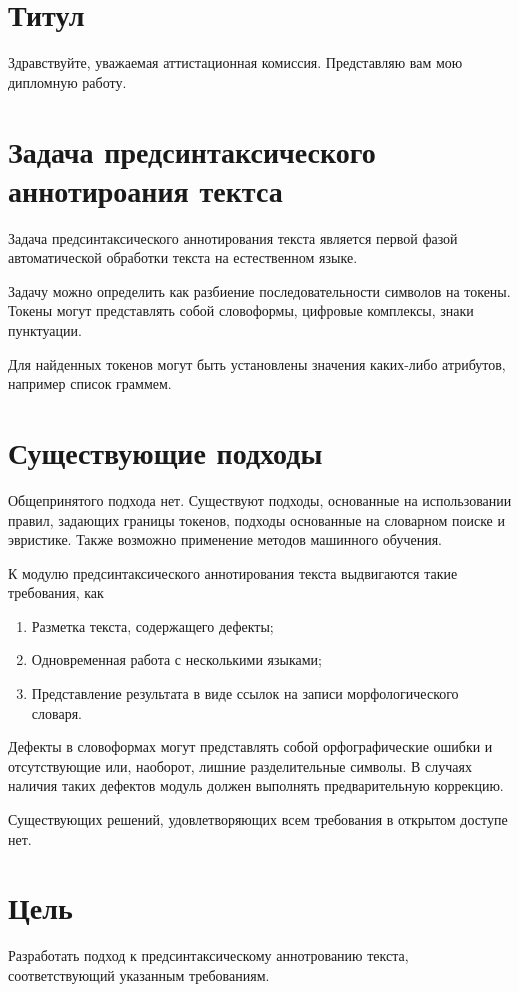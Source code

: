 \documentclass[14pt]{extarticle}
\begin{document}
\section{Титул}
Здравствуйте, уважаемая аттистационная комиссия. 
Представляю вам мою дипломную работу.


\section{Задача предсинтаксического аннотироания тектса}

Задача предсинтаксического аннотирования текста является первой фазой автоматической обработки текста на естественном языке. 

Задачу можно определить как разбиение последовательности символов на токены. Токены могут представлять собой словоформы, цифровые комплексы, знаки пунктуации.

Для найденных токенов могут быть установлены значения каких-либо атрибутов, например список граммем. 

\section{Существующие подходы}
Общепринятого подхода нет. Существуют подходы, основанные на использовании правил, задающих границы токенов, подходы основанные на словарном поиске и эвристике. Также возможно применение методов машинного обучения. 

К модулю предсинтаксического аннотирования текста выдвигаются такие требования, как
\begin{enumerate}
	\item 
	Разметка текста, содержащего дефекты;
	\item
	Одновременная работа с несколькими языками;
	\item
	Представление результата в виде ссылок на записи морфологического словаря.
\end{enumerate}

Дефекты в словоформах могут представлять собой орфографические ошибки и отсутствующие или, наоборот, лишние разделительные символы. В случаях наличия таких дефектов модуль должен выполнять предварительную коррекцию.

Существующих решений, удовлетворяющих всем требования в открытом доступе нет.

\section{Цель}
Разработать подход к предсинтаксическому аннотрованию текста, соответствующий указанным требованиям.
\end{document}
